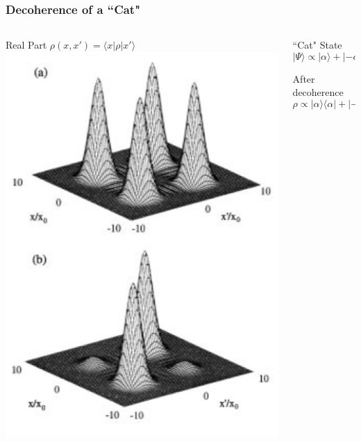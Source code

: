 \documentclass{beamer}
\begin{document}
\begin{frame}
\frametitle{Decoherence of a ``Cat"}
\begin{columns}
\begin{column}{0.47\textwidth}
 Real Part
 $\rho(x,x') = \langle x | \rho | x' \rangle $
 \includegraphics[scale=.3]{cat_state.pdf}
 \end{column}
 \begin{column}{0.47\textwidth}
 ``Cat" State
\begin{equation}
| \Psi \rangle \propto | \alpha \rangle + | - \alpha \rangle \nonumber
\end{equation}
\par
\vspace{.75in}
After decoherence
\begin{equation}
\rho \propto | \alpha \rangle \langle \alpha | + | - \alpha \rangle \langle - \alpha |  \nonumber 
\end{equation}
 \end{column}
\end{columns}
\end{frame}
\end{document}
